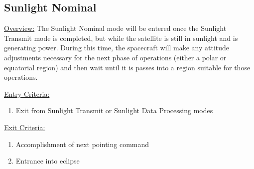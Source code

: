 \documentclass{article}
\begin{document}
\newpage

\subsection{Sunlight Nominal}

\underline{Overview:} The Sunlight Nominal mode will be entered once the Sunlight Transmit mode is completed, but while the satellite is still in sunlight and is generating power. During this time, the spacecraft will make any attitude adjustments necessary for the next phase of operations (either a polar or equatorial region) and then wait until it is passes into a region suitable for those operations.

\underline{Entry Criteria:} 

\begin{enumerate}
\item Exit from Sunlight Transmit or Sunlight Data Processing modes
\end{enumerate}

\underline{Exit Criteria:}

\begin{enumerate}
\item Accomplishment of next pointing command
\item Entrance into eclipse
\end{enumerate}
\end{document}
